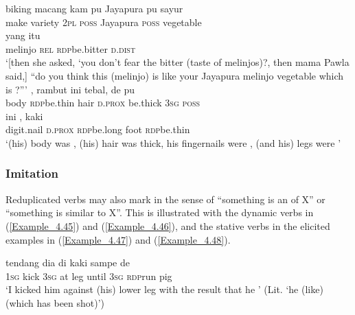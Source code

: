 \ea
\label{Example_4.43}
\gll {\ldots} {{biking}} {{macang}} {kam} {{pu}} {Jayapura} {pu} {sayur}\\ %
  { }  {make}  {variety}  \textsc{2pl}  {\textsc{poss}}  Jayapura  \textsc{poss}  vegetable\\
  {yang}  {}  {itu}\\
 {melinjo}  {\textsc{rel}}  {\textsc{rdp}{\Tilde}be.bitter}  {\textsc{d.dist}}\\
\glt 
‘[then she asked, ‘you don’t fear the bitter (taste of melinjos)?, then mama Pawla said,] ``do you think this (melinjo) is like your Jayapura melinjo vegetable which is ?''' \textstyleExampleSource{[080923-004-Cv.0016]}
\z
\ea
\label{Example_4.44}
 {{},} {rambut} {{ini}} {{tebal},} {de} {pu}\\ %
 body  {\textsc{rdp}{\Tilde}be.thin}  hair  {\textsc{d.prox}}  {be.thick}  \textsc{3sg}  \textsc{poss}\\
   ini  {},  {kaki}  {}\\
 {digit.nail}  \textsc{d.prox}  {\textsc{rdp}{\Tilde}be.long}  {foot}  {\textsc{rdp}{\Tilde}be.thin}\\
\glt
‘(his) body was , (his) hair was thick, his fingernails were , (and his) legs were ’ \textstyleExampleSource{[081006-035-CvEx.0077]}
\z


\subsubsection[Imitation]{Imitation}
\label{Para_4.2.2.7}
Reduplicated verbs may also mark  in the sense of ``something is an  of X'' or ``something is similar to X''. This is illustrated with the dynamic verbs in (\ref{Example_4.45}) and (\ref{Example_4.46}), and the stative verbs in the elicited examples in (\ref{Example_4.47}) and (\ref{Example_4.48}).


\ea
\label{Example_4.45}
 {tendang} {dia} {di} {kaki} {sampe} {de} {} {}\\ %
 \textsc{1sg}  kick  \textsc{3sg}  at  leg  until  \textsc{3sg}  \textsc{rdp}{\Tilde}run  pig\\
\glt 
‘I kicked him against (his) lower leg with the result that he ’ (Lit. ‘he  (like)  (which has been shot)’) \textstyleExampleSource{[Elicited BR120813.004]}
\z


